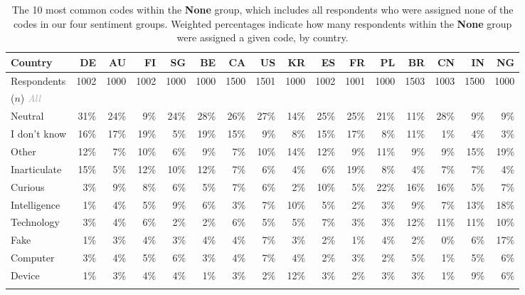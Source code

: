 \documentclass[11pt]{article} %
\newcommand\graynew[1]{\textcolor{darkgray}{#1}}
\def\None/{{\fontfamily{lmss}\selectfont\textbf{None}}}
\begin{document}
\begin{table}\centering
\footnotesize
\begin{tabular}{@{}l rrrrr rrrrr rrrrr @{}}

Country	&	\bf DE	&	\bf AU	&	\bf FI	&	\bf SG	&	\bf BE	&	\bf CA	&	\bf US	&	\bf KR	&	\bf ES	&	\bf FR	&	\bf PL	&	\bf BR	&	\bf CN	&	\bf IN	&	\bf NG		\\
	
	\midrule
												
Respondents 	&	1002	&	1000	&	1002	&	1000	&	1000	&	1500	&	1501	&	1000	&	1002	&	1001	&	1000	&	1503	&	1003	&	1500	&	1000				\\
	($n$) \graynew{\emph{All}} \\
	\midrule
													
Neutral	&	31\%	&	24\%	&	9\%	&	24\%	&	28\%	&	26\%	&	27\%	&	14\%	&	25\%	&	25\%	&	21\%	&	11\%	&	28\%	&	9\%	&	9\%	\\
I don't know 	&	16\%	&	17\%	&	19\%	&	5\%	&	19\%	&	15\%	&	9\%	&	8\%	&	15\%	&	17\%	&	8\%	&	11\%	&	1\%	&	4\%	&	3\%	\\
Other	&	12\%	&	7\%	&	10\%	&	6\%	&	9\%	&	7\%	&	10\%	&	14\%	&	12\%	&	9\%	&	11\%	&	9\%	&	9\%	&	15\%	&	19\%	\\
Inarticulate	&	15\%	&	5\%	&	12\%	&	10\%	&	12\%	&	7\%	&	6\%	&	4\%	&	6\%	&	19\%	&	8\%	&	4\%	&	7\%	&	7\%	&	4\%	\\
Curious	&	3\%	&	9\%	&	8\%	&	6\%	&	5\%	&	7\%	&	6\%	&	2\%	&	10\%	&	5\%	&	22\%	&	16\%	&	16\%	&	5\%	&	7\%	\\
Intelligence	&	1\%	&	4\%	&	5\%	&	9\%	&	6\%	&	3\%	&	7\%	&	10\%	&	5\%	&	2\%	&	3\%	&	9\%	&	7\%	&	13\%	&	18\%	\\
Technology	&	3\%	&	4\%	&	6\%	&	2\%	&	2\%	&	6\%	&	5\%	&	5\%	&	7\%	&	3\%	&	3\%	&	12\%	&	11\%	&	11\%	&	10\%	\\
Fake	&	1\%	&	3\%	&	4\%	&	3\%	&	4\%	&	4\%	&	7\%	&	3\%	&	2\%	&	1\%	&	4\%	&	2\%	&	0\%	&	6\%	&	17\%	\\
Computer	&	3\%	&	4\%	&	5\%	&	6\%	&	3\%	&	4\%	&	7\%	&	4\%	&	2\%	&	3\%	&	2\%	&	5\%	&	1\%	&	5\%	&	6\%	\\
Device	&	1\%	&	3\%	&	4\%	&	4\%	&	1\%	&	3\%	&	2\%	&	12\%	&	3\%	&	2\%	&	3\%	&	3\%	&	1\%	&	9\%	&	6\%	\\

\bottomrule
\vspace{0.01cm}
\end{tabular}

\caption{ The 10 most common codes within the \None/ group, which includes all respondents who were assigned none of the codes in our four sentiment groups. Weighted percentages indicate how many respondents within the \None/ group were assigned a given code, by country. }
\label{tab:nones}

\end{table}
\end{document}
